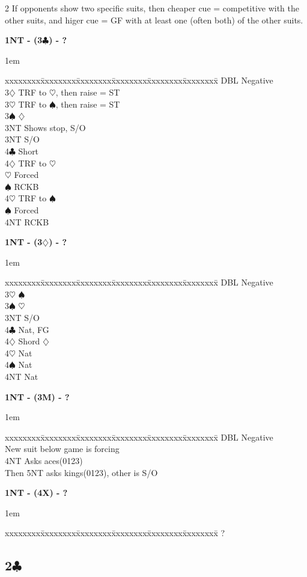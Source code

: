 \documentclass[10pt]{article}
\renewcommand{\c}{$\clubsuit$}
\renewcommand{\d}{$\diamondsuit$}
\newcommand{\h}{$\heartsuit$}
\newcommand{\s}{$\spadesuit$}
\newcommand{\x}{DBL}
\newenvironment{bidtable}[1][]
{\textbf{#1}
  \begin{adjustwidth}{1em}{}
    \addvspace{2pt}
    \begin{tabbing}
      xxxxxxxx\=xxxxxxxx\=xxxxxxxx\=xxxxxxxx\=xxxxxxxx\=xxxxxxxx\=\kill}
{\end{tabbing}\end{adjustwidth}\bigskip}%
\newcommand{\pdfc}{\texorpdfstring{\c{}}{C}}
\begin{document}
\begin{multicols*}{2}
If opponents show two specific suits, then cheaper cue = competitive with the other suits, and higer cue = GF with at least one (often both) of the other suits.

\begin{bidtable}[1NT - (3\c) - ?]
\x  \> Negative                   \\
3\d \> TRF to \h, then raise = ST \\
3\h \> TRF to \s, then raise = ST \\
3\s \> \d                         \\
    \> 3NT \> Shows stop, S/O     \\
3NT \> S/O                        \\
4\c \> Short                      \\
4\d \> TRF to \h                  \\
    \h \> Forced              \\
    \>     \s \> RCKB         \\
4\h \> TRF to \s                  \\
    \s \> Forced              \\
    \>     \> 4NT \> RCKB
\end{bidtable}

\begin{bidtable}[1NT - (3\d) - ?]
\x  \> Negative \\
3\h \> \s       \\
3\s \> \h       \\
3NT \> S/O      \\
4\c \> Nat, FG  \\
4\d \> Shord \d \\
4\h \> Nat      \\
4\s \> Nat      \\
4NT \> Nat      \\
\end{bidtable}

\begin{bidtable}[1NT - (3M) - ?]
\x  \> Negative                \\
New suit below game is forcing \\
4NT \> Asks aces(0123)         \\
    \> Then 5NT asks kings(0123), other is S/O
\end{bidtable}

\begin{bidtable}[1NT - (4X) - ?]
?
\end{bidtable}
\subsection{2\pdfc}

\end{multicols*}
\end{document}
